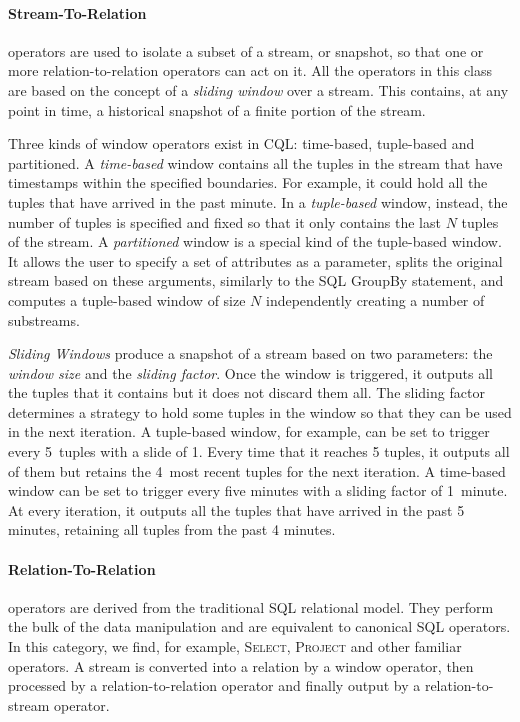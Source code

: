 \paragraph{Stream-To-Relation} operators are used to isolate a subset of a stream, or snapshot, so that
one or more relation-to-relation operators can act on it. All the operators in this class are based on
the concept of a \textit{sliding window} over a stream. This contains, at any point in time, a
historical snapshot of a finite portion of the stream. 

Three kinds of window operators exist in CQL: time-based, tuple-based and partitioned. A
\textit{time-based} window contains all the tuples in the stream that have timestamps within the
specified boundaries. For example, it could hold all the tuples that have arrived in the past minute. In
a \textit{tuple-based} window, instead, the number of tuples is specified and fixed so that it only
contains the last $N$ tuples of the stream. A \textit{partitioned} window is a special kind of the
tuple-based window. It allows the user to specify a set of attributes as a parameter, splits the
original stream based on these arguments, similarly to the SQL GroupBy statement, and computes a
tuple-based window of size $N$ independently creating a number of substreams.

\textit{Sliding Windows} produce a snapshot of a stream based on two parameters: the \textit{window size}
and the \textit{sliding factor}. Once the window is triggered, it outputs all the tuples that it
contains but it does not discard them all. The sliding factor determines a strategy to hold some tuples
in the window so that they can be used in the next iteration. A tuple-based window, for example, can be
set to trigger every 5~tuples with a slide of 1. Every time that it reaches 5 tuples, it outputs all of
them but retains the 4~most recent tuples for the next iteration. A time-based window can be set to
trigger every five minutes with a sliding factor of 1~minute. At every iteration, it outputs all the
tuples that have arrived in the past 5 minutes, retaining all tuples from the past 4 minutes. 

\paragraph{Relation-To-Relation} operators are derived from the traditional SQL relational model. They
perform the bulk of the data manipulation and are equivalent to canonical SQL operators. In this
category, we find, for example, \textsc{Select, Project} and other familiar operators. A stream is
converted into a relation by a window operator, then processed by a relation-to-relation operator and finally output by
a relation-to-stream operator.
			
